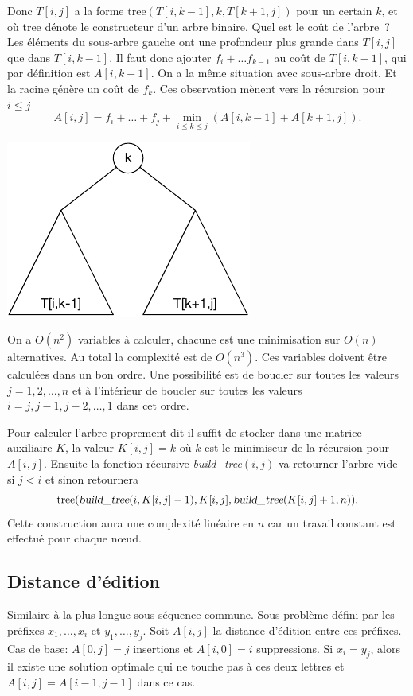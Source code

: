 \documentclass[12pt]{article}
\begin{document}
Donc $T[i,j]$ a la forme $\textrm{tree}(T[i,k-1],k,T[k+1,j])$ pour un certain $k$, et où tree dénote le constructeur d'un arbre binaire. Quel est le coût de l'arbre~?
Les éléments du sous-arbre gauche ont une profondeur plus grande dans $T[i,j]$ que dans $T[i,k-1]$. Il faut donc ajouter $f_i + \ldots f_{k-1}$ au coût de $T[i,k-1]$, qui par définition est $A[i,k-1]$.  On a la même situation avec sous-arbre droit. Et la racine génère un coût de $f_k$.  Ces observation mènent vers la récursion pour $i \leq j$
\[
	A[i,j] = f_i + \ldots + f_j +  \min_{i\leq k\leq j} (A[i,k-1] + A[k+1,j]).
\]


     \centerline{\includegraphics{abre_bin_rech_opt.pdf}}


On a $O(n^2)$ variables à calculer, chacune est une minimisation sur $O(n)$ alternatives. Au total la complexité est de $O(n^3)$.
Ces variables doivent être calculées dans un bon ordre. Une possibilité est de boucler sur toutes les valeurs $j=1,2,\ldots, n$ et à l'intérieur de boucler sur toutes les valeurs $i=j,j-1, j-2, \ldots, 1$ dans cet ordre.

Pour calculer l'arbre proprement dit il suffit de stocker dans une matrice auxiliaire $K$, la valeur $K[i,j]=k$ où $k$ est le minimiseur de la récursion pour $A[i,j]$.  Ensuite la fonction récursive \textsl{build\_tree}$(i,j)$ va retourner l'arbre vide si $j<i$ et sinon retournera 
\[
\textrm{tree}(\textsl{build\_tree}(i,K[i,j]-1), K[i,j], \textsl{build\_tree}(K[i,j]+1,n)).
\]
Cette construction aura une complexité linéaire en $n$ car un travail constant est effectué pour chaque nœud.


\subsection{Distance d'édition}

Similaire à la plus longue sous-séquence commune.
Sous-problème défini par les préfixes $x_1,\ldots,x_i$ et $y_1,\ldots,y_j$.
Soit $A[i,j]$ la distance d'édition entre ces préfixes. 
Cas de base: $A[0,j]=j$ insertions et $A[i,0]=i$ suppressions.
Si $x_i=y_j$, alors il existe une solution optimale qui ne touche pas à ces deux lettres et $A[i,j]= A[i-1,j-1]$ dans ce cas.
\end{document}
